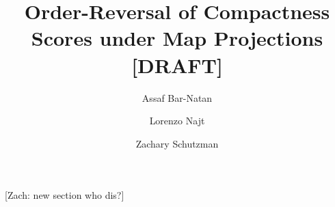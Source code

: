 \documentclass[11pt]{article}
\title{Order-Reversal of Compactness Scores under Map Projections [DRAFT]}
\author{Assaf Bar-Natan \and Lorenzo Najt \and Zachary Schutzman }%
\theoremstyle{definition}
\theoremstyle{remark}
\newif \ifdraft \drafttrue
\newcommand{\zs}[1]{\ifdraft \textcolor{RedViolet}{[Zach: #1]} \fi}
\begin{document}
\maketitle
	
\begin{abstract}

\end{abstract}




\zs{new section who dis?}











\end{document}

